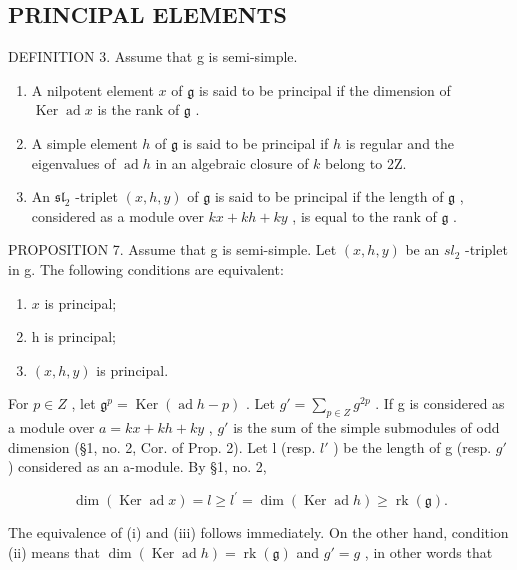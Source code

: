 \subsection{PRINCIPAL ELEMENTS}

DEFINITION 3. Assume that g is semi-simple.

\begin{enumerate}
\def\labelenumi{(\roman{enumi})}
\item
  A nilpotent element \(x\) of \(\mathfrak{g}\) is said to be principal if the dimension of \(\operatorname{Ker} \operatorname{ad} x\) is the rank of \(\mathfrak{g}\) .
\item
  A simple element \(h\) of \(\mathfrak{g}\) is said to be principal if \(h\) is regular and the eigenvalues of \(\operatorname{ad} h\) in an algebraic closure of \(k\) belong to 2Z.
\item
  An \(\mathfrak{sl}_2\) -triplet \((x,h,y)\) of \(\mathfrak{g}\) is said to be principal if the length of \(\mathfrak{g}\) , considered as a module over \(kx + kh + ky\) , is equal to the rank of \(\mathfrak{g}\) .
\end{enumerate}

PROPOSITION 7. Assume that g is semi-simple. Let \((x,h,y)\) be an \(sl_{2}\) -triplet in g. The following conditions are equivalent:

\begin{enumerate}
\def\labelenumi{(\roman{enumi})}
\item
  \(x\) is principal;
\item
  h is principal;
\item
  \((x,h,y)\) is principal.
\end{enumerate}

For \(p \in Z\) , let \(\mathfrak{g}^{p} = \operatorname{Ker}(\operatorname{ad} h - p)\) . Let \(g' = \sum_{p \in Z} g^{2p}\) . If g is considered as a module over \(a = kx + kh + ky\) , \(g'\) is the sum of the simple submodules of odd dimension (§1, no. 2, Cor. of Prop. 2). Let l (resp. \(l'\) ) be the length of g (resp. \(g'\) ) considered as an a-module. By §1, no. 2,

\[
\dim (\operatorname{Ker} \operatorname{ad} x) = l \geq l ^ {\prime} = \dim (\operatorname{Ker} \operatorname{ad} h) \geq \operatorname{rk} (\mathfrak {g}).
\]

The equivalence of (i) and (iii) follows immediately. On the other hand, condition (ii) means that \(\dim(\operatorname{Ker} \operatorname{ad} h) = \operatorname{rk}(\mathfrak{g})\) and \(g' = g\) , in other words that

